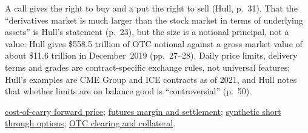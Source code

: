 \begin{qfdefinition}
 A call gives the right to buy and a put the right to sell (Hull, p.~31). That the ``derivatives market is much larger than the stock market in terms of underlying assets'' is Hull's statement (p.~23), but the size is a notional principal, not a value: Hull gives \$558.5 trillion of OTC notional against a gross market value of about \$11.6 trillion in December~2019 (pp.~27--28). Daily price limits, delivery terms and grades are contract-specific exchange rules, not universal features; Hull's examples are CME Group and ICE contracts as of 2021, and Hull notes that whether limits are on balance good is ``controversial'' (p.~50).

 \hyperref[res:cost-of-carry-forward-price]{cost-of-carry forward price}; \hyperref[mech:futures-margin-settlement]{futures margin and settlement}; \hyperref[res:synthetic-short-put-call]{synthetic short through options}; \hyperref[mech:otc-clearing-collateral]{OTC clearing and collateral}.

\end{qfdefinition}

